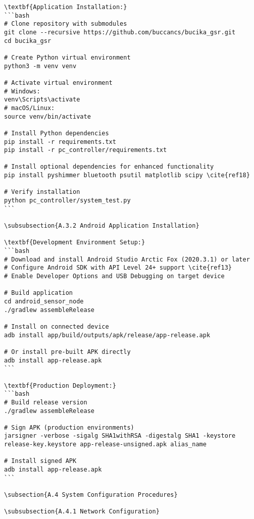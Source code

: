 \begin{verbatim}
\textbf{Application Installation:}
```bash
# Clone repository with submodules
git clone --recursive https://github.com/buccancs/bucika_gsr.git
cd bucika_gsr

# Create Python virtual environment
python3 -m venv venv

# Activate virtual environment
# Windows:
venv\Scripts\activate
# macOS/Linux:
source venv/bin/activate

# Install Python dependencies
pip install -r requirements.txt
pip install -r pc_controller/requirements.txt

# Install optional dependencies for enhanced functionality
pip install pyshimmer bluetooth psutil matplotlib scipy \cite{ref18}

# Verify installation
python pc_controller/system_test.py
```

\subsubsection{A.3.2 Android Application Installation}

\textbf{Development Environment Setup:}
```bash
# Download and install Android Studio Arctic Fox (2020.3.1) or later
# Configure Android SDK with API Level 24+ support \cite{ref13}
# Enable Developer Options and USB Debugging on target device

# Build application
cd android_sensor_node
./gradlew assembleRelease

# Install on connected device
adb install app/build/outputs/apk/release/app-release.apk

# Or install pre-built APK directly
adb install app-release.apk
```

\textbf{Production Deployment:}
```bash
# Build release version
./gradlew assembleRelease

# Sign APK (production environments)
jarsigner -verbose -sigalg SHA1withRSA -digestalg SHA1 -keystore release-key.keystore app-release-unsigned.apk alias_name

# Install signed APK
adb install app-release.apk
```

\subsection{A.4 System Configuration Procedures}

\subsubsection{A.4.1 Network Configuration}


\end{verbatim}
